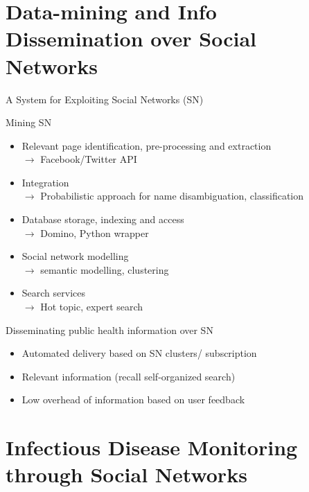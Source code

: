 \documentclass{beamer}
\begin{document}
\section{Data-mining and Info Dissemination over Social Networks}
\begin{frame}[t]{A System for Exploiting Social Networks (SN)}	
\begin{block}{Mining SN}
\begin{itemize}
\item  \small Relevant page \alert{identification, pre-processing and extraction}\\
$\rightarrow$  \scriptsize Facebook/Twitter API
\item  \small \alert{Integration}\\ 
$\rightarrow$  \scriptsize  Probabilistic approach for name disambiguation, classification
\item  \small Database \alert{storage,  indexing and access}\\
$\rightarrow$  \scriptsize Domino, Python wrapper
\item \small Social network \alert{modelling}\\ 
$\rightarrow$  \scriptsize semantic modelling, clustering
\item \small \alert{Search} services\\
$\rightarrow$ \scriptsize Hot topic, expert search 
\end{itemize}
\end{block}
  	
\begin{block}{Disseminating public health information over SN}
\begin{itemize}
\item \small \alert{Automated delivery} based on SN clusters/ subscription
\item \small \alert{Relevant} information (recall self-organized search)
\item \small \alert{Low overhead} of information based on user feedback
\end{itemize}
\end{block}
  	
\end{frame}

\section{Infectious Disease Monitoring through  Social Networks}
\end{document}
